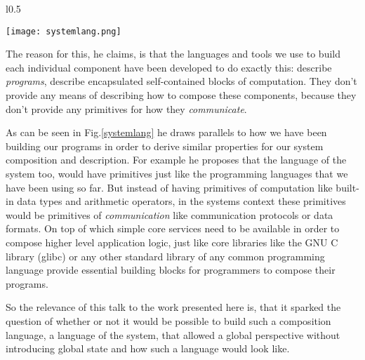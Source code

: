 \newpage
\begin{wrapfigure}{l}{0.5\textwidth}

  \texttt{[image: systemlang.png]}
  \caption{Slide-excerp from the talk ``The Language of the System'' by
          Rich Hickey that draws parallels between the composition of
          (local) programs and distributed systems.}
  \label{systemlang}

\end{wrapfigure}





The reason for this, he claims, is that the languages and tools
we use to build each individual component have been developed to
do exactly this: describe \textit{programs}, describe encapsulated
self-contained blocks of computation. They don't provide any
means of describing how to compose these components, because they
don't provide any primitives for how they \textit{communicate}.

As can be seen in Fig.\ref{systemlang} he draws parallels to how
we have been building our programs in order to derive similar
properties for our system composition and description. For example
he proposes that the language of the system too, would have
primitives just like the programming languages that we have been
using so far. But instead of having primitives of computation like
built-in data types and arithmetic operators, in the systems context
these primitives would be primitives of \textit{communication} like
communication protocols or data formats. On top of which simple
core services need to be available in order to compose higher
level application logic, just like core libraries like
the GNU C library (glibc) \cite{glibc} or any other standard
library of any common programming language provide essential
building blocks for programmers to compose their programs.
\newline

So the relevance of this talk to the work presented here is, that
it sparked the question of whether or not it would be possible to
build such a composition language, a language of the system,
that allowed a global perspective without introducing global
state and how such a language would look like.
\newline

